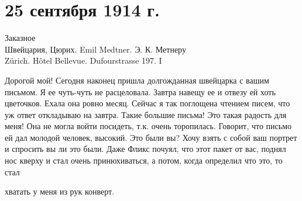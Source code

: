\section{25 сентября 1914 г.}


Заказное \\
Швейцария, Цюрих.
Emil Medtner.
Э. К. Метнеру \\
Zürich.
Hôtel Bellevue.
Dufourstrasse 197. I


Дорогой мой! Сегодня наконец пришла долгожданная швейцарка с вашим письмом. Я
ее чуть-чуть не расцеловала. Завтра навещу ее и отвезу ей хоть цветочков. Ехала
она ровно месяц. Сейчас я так поглощена чтением писем, что уж ответ откладываю
на завтра. Такие большие письма! Это такая радость для меня! Она не могла войти
посидеть, т.к. очень торопилась. Говорит, что письмо ей дал молодой человек,
высокий. Это были вы? Хочу взять с собой ваш портрет и спросить вы ли это были.
Даже Фликс почуял, что этот пакет от вас, поднял нос кверху и стал очень
принюхиваться, а потом, когда определил что это, то стал


\noindent
хватать у меня из рук конверт.
